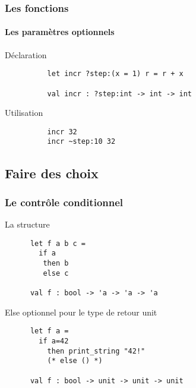 \begin{frame}[fragile]
	\frametitle{Les fonctions}
	\framesubtitle{Les paramètres optionnels}	

	 	\begin{block}{Déclaration}
		\begin{lstlisting}
		  let incr ?step:(x = 1) r = r + x
		  
		  val incr : ?step:int -> int -> int
		\end{lstlisting}
		\end{block}

	 	\begin{block}{Utilisation}
		\begin{lstlisting}
		  incr 32
		  incr ~step:10 32
		\end{lstlisting}
		\end{block}

\end{frame}

\subsection{Faire des choix} %
\begin{frame}[fragile]
	\frametitle{Le contrôle conditionnel}
	\begin{block}{La structure}
	\begin{lstlisting}
	  let f a b c = 
	    if a
	     then b 
	     else c

	  val f : bool -> 'a -> 'a -> 'a
	\end{lstlisting}
	\end{block}
	\begin{block}{Else optionnel pour le type de retour unit}
	\begin{lstlisting}
	  let f a =
	    if a=42
	      then print_string "42!" 
	      (* else () *)

	  val f : bool -> unit -> unit -> unit
	\end{lstlisting}
	\end{block}
\end{frame}

